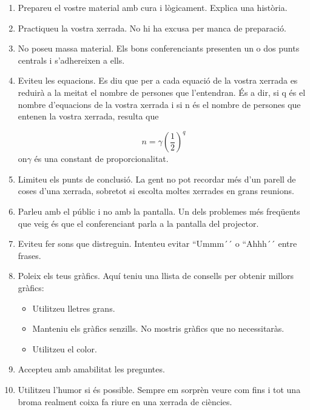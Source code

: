 \documentclass[12pt]{article}
\begin{document}
\begin{enumerate}
\item Prepareu el vostre material amb cura i lògicament. Explica una història.

\item Practiqueu la vostra xerrada. No hi ha excusa per manca de preparació.

\item No poseu massa material. Els bons conferenciants presenten un o dos punts centrals i s'adhereixen a ells.

\item Eviteu les equacions. Es diu que per a cada equació de la vostra xerrada es reduirà a la meitat el nombre de persones que l'entendran. És a dir, si q és el nombre d'equacions de la vostra xerrada i si n és el nombre de persones que entenen la vostra xerrada, resulta que

\begin{equation}
n = \gamma \left( \frac{1}{2} \right)^q
\end{equation}
on$\gamma$ és una constant de proporcionalitat.

\item Limiteu els punts de conclusió. La gent no pot recordar més d'un parell de coses d'una xerrada, sobretot si escolta moltes xerrades en grans reunions.

\item Parleu amb el públic i no amb la pantalla. Un dels problemes més freqüents que veig és que el conferenciant parla a la pantalla del projector.

\item Eviteu fer sons que distreguin. Intenteu evitar ``Ummm´´ o ``Ahhh´´ entre frases.

\item  Poleix els teus gràfics. Aquí teniu una llista de consells per obtenir millors gràfics:

\begin{itemize}
\item Utilitzeu lletres grans.

\item Manteniu els gràfics senzills. No mostris gràfics que no necessitaràs.

\item  Utilitzeu el color.
\end{itemize}

\item Accepteu amb amabilitat les preguntes.

\item  Utilitzeu l'humor si és possible. Sempre em sorprèn  veure com fins i tot una broma realment coixa fa riure en una xerrada de ciències.


\end{enumerate}
\end{document}
